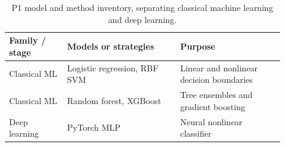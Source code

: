 \begin{table}[!htbp]\centering\footnotesize
\setlength{\tabcolsep}{5pt}
\caption{P1 model and method inventory, separating classical machine learning and deep learning.}\label{tab:p1methods}
\begin{tabular}{@{}p{0.19\linewidth}p{0.37\linewidth}p{0.34\linewidth}@{}}\toprule
\textbf{Family / stage} & \textbf{Models or strategies} & \textbf{Purpose}\\\midrule
\rowcolor{gold!10}
Classical ML & Logistic regression, RBF SVM & Linear and nonlinear decision boundaries\\
\rowcolor{gold!10}
Classical ML & Random forest, XGBoost & Tree ensembles and gradient boosting\\
\rowcolor{teal!9}
Deep learning & PyTorch MLP & Neural nonlinear classifier\\
\bottomrule\end{tabular}
\end{table}

